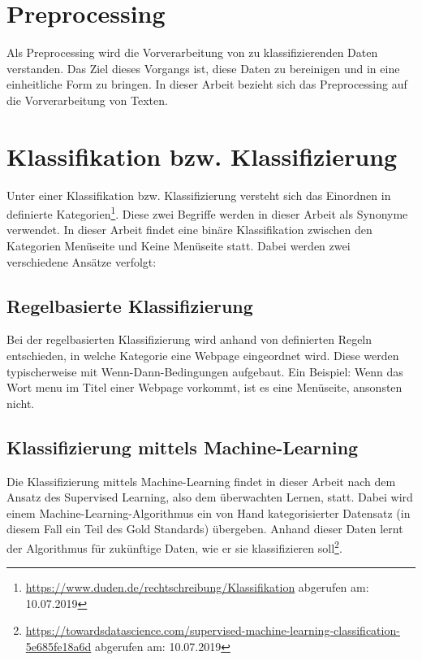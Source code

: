 \section{Preprocessing}
Als Preprocessing wird die Vorverarbeitung von zu klassifizierenden Daten verstanden.
Das Ziel dieses Vorgangs ist, diese Daten zu bereinigen und in eine einheitliche Form zu bringen.  \cite[p. 155]{liu2007web}
In dieser Arbeit bezieht sich das Preprocessing auf die Vorverarbeitung von Texten.
\section{Klassifikation bzw. Klassifizierung}
Unter einer Klassifikation bzw. Klassifizierung versteht sich das Einordnen in definierte Kategorien\footnote{\url{https://www.duden.de/rechtschreibung/Klassifikation} abgerufen am: 10.07.2019}.
Diese zwei Begriffe werden in dieser Arbeit als Synonyme verwendet.
In dieser Arbeit findet eine binäre Klassifikation zwischen den Kategorien \glqq Menüseite\grqq{} und \glqq Keine Menüseite\grqq{} statt.
Dabei werden zwei verschiedene Ansätze verfolgt:
\subsection{Regelbasierte Klassifizierung}
Bei der regelbasierten Klassifizierung wird anhand von definierten Regeln entschieden, in welche Kategorie eine Webpage eingeordnet wird.
Diese werden typischerweise mit \glqq Wenn-Dann\grqq-Bedingungen aufgebaut. \cite[p. 125 ff]{jackson2007natural}
Ein Beispiel: Wenn das Wort \glqq menu\grqq{} im Titel einer Webpage vorkommt, ist es eine Menüseite, ansonsten nicht.
\subsection{Klassifizierung mittels Machine-Learning}
Die Klassifizierung mittels Machine-Learning findet in dieser Arbeit nach dem Ansatz des \glqq Supervised Learning\grqq{}, also dem überwachten Lernen, statt.
Dabei wird einem Machine-Learning-Algorithmus ein von Hand kategorisierter Datensatz (in diesem Fall ein Teil des Gold Standards) übergeben.
Anhand dieser Daten lernt der Algorithmus für zukünftige Daten, wie er sie klassifizieren soll\footnote{\url{https://towardsdatascience.com/supervised-machine-learning-classification-5e685fe18a6d} abgerufen am: 10.07.2019}.
